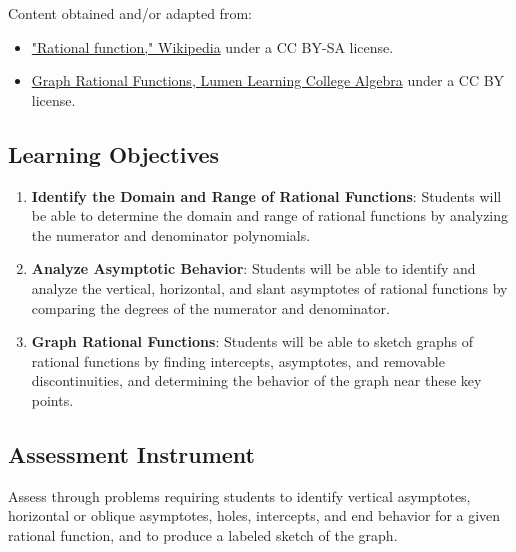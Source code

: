 Content obtained and/or adapted from:

\begin{itemize}
    \item \href{https://en.wikipedia.org/wiki/Rational_function}{"Rational function," Wikipedia} under a CC BY-SA license.
    \item \href{https://courses.lumenlearning.com/ivytech-collegealgebra/chapter/graph-rational-functions/}{Graph Rational Functions, Lumen Learning College Algebra} under a CC BY license.
\end{itemize}

\subsection{Learning Objectives}
\label{ssec:lear-eb17}

\begin{enumerate}
    \item \textbf{Identify the Domain and Range of Rational Functions}: Students will be able to determine the domain and range of rational functions by analyzing the numerator and denominator polynomials.
    \item \textbf{Analyze Asymptotic Behavior}: Students will be able to identify and analyze the vertical, horizontal, and slant asymptotes of rational functions by comparing the degrees of the numerator and denominator.
    \item \textbf{Graph Rational Functions}: Students will be able to sketch graphs of rational functions by finding intercepts, asymptotes, and removable discontinuities, and determining the behavior of the graph near these key points.
\end{enumerate}

\subsection{Assessment Instrument}
\label{ssec:asse-5038}

Assess through problems requiring students to identify vertical asymptotes, horizontal or
oblique asymptotes, holes, intercepts, and end behavior for a given rational function, and
to produce a labeled sketch of the graph.

